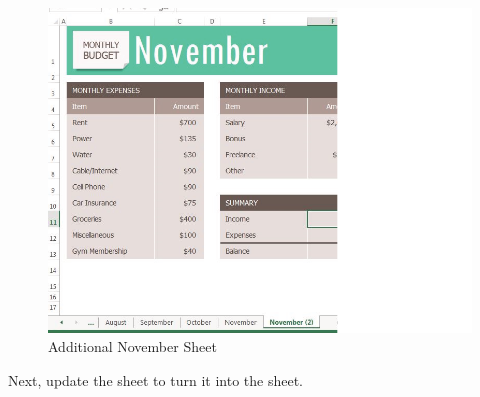 \begin{figure}[H]
	\centering
	\includegraphics[width=\maxwidth{.95\linewidth}]{gfx/ch06_fig02}
	\caption{Additional November Sheet}
	\label{06:fig02}
\end{figure}

Next, update the  sheet to turn it into the  sheet.

